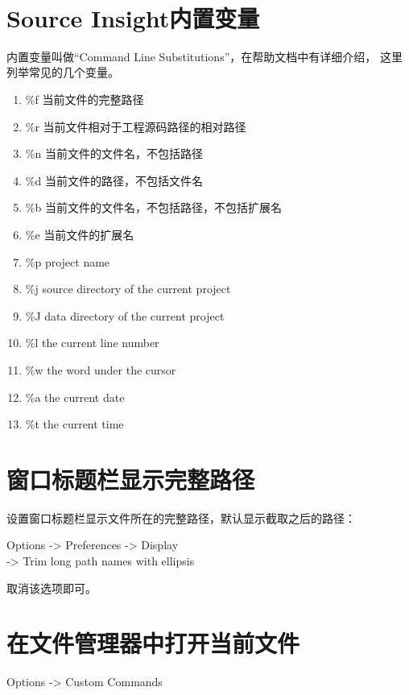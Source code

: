 \documentclass[a4paper,11pt]{article}
\begin{document}
\tt %
\pagestyle{header}
\sybmaketitle
\tableofcontents
\newpage

\pagestyle{main}
\setcounter{page}{1}

\section[Source Insight内置变量]{Source Insight内置变量}
内置变量叫做“Command Line Substitutions”，在帮助文档中有详细介绍，
这里列举常见的几个变量。

\begin{enumerate}
\item \%f 当前文件的完整路径
\item \%r 当前文件相对于工程源码路径的相对路径
\item \%n 当前文件的文件名，不包括路径
\item \%d 当前文件的路径，不包括文件名
\item \%b 当前文件的文件名，不包括路径，不包括扩展名
\item \%e 当前文件的扩展名
\item \%p project name
\item \%j source directory of the current project
\item \%J data directory of the current project
\item \%l the current line number
\item \%w the word under the cursor
\item \%a the current date
\item \%t the current time
\end{enumerate}

\section[窗口标题栏显示完整路径]{窗口标题栏显示完整路径}
设置窗口标题栏显示文件所在的完整路径，默认显示截取之后的路径：

Options -> Preferences -> Display\\
-> Trim long path names with ellipsis

取消该选项即可。

\section[在文件管理器中打开当前文件]{在文件管理器中打开当前文件}
Options -> Custom Commands
\end{document}
